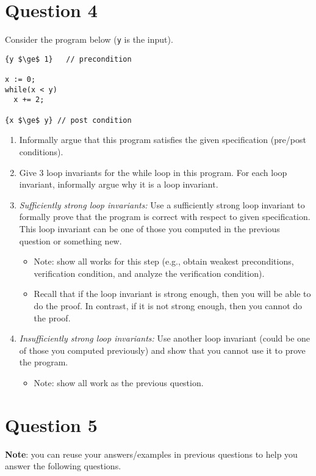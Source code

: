\documentclass[10pt]{article}
\begin{document}
\newpage
\section{Question 4}

Consider the program below (\texttt{y} is the input). 
\begin{lstlisting}
{y $\ge$ 1}   // precondition

x := 0;
while(x < y)
  x += 2;

{x $\ge$ y} // post condition
\end{lstlisting}


\begin{enumerate}
\item Informally argue that this program satisfies the given specification (pre/post conditions).
\item Give 3 loop invariants for the while loop in this program. For each loop invariant, informally argue why it is a loop invariant.  
\item \emph{Sufficiently strong loop invariants:}  Use a sufficiently strong loop invariant to formally prove that the program is correct with respect to given specification. This loop invariant can be one of those you computed in the previous question or something new.
  \begin{itemize}
    \item Note: show all works for this step (e.g., obtain weakest preconditions, verification condition, and analyze the verification condition).
  \item Recall that if the loop invariant is strong enough, then you will be able to do the proof. In contrast, if it is not strong enough, then you cannot do the proof.
  \end{itemize}
\item \emph{Insufficiently strong loop invariants:} Use another loop invariant (could be one of those you computed previously) and show that you cannot use it to prove the program. 
  \begin{itemize}
    \item Note: show all work as the previous question.
  \end{itemize}
\end{enumerate}

\newpage
\section{Question 5}

\textbf{Note}: you can reuse your answers/examples in previous questions to help you answer the following questions.
\end{document}
